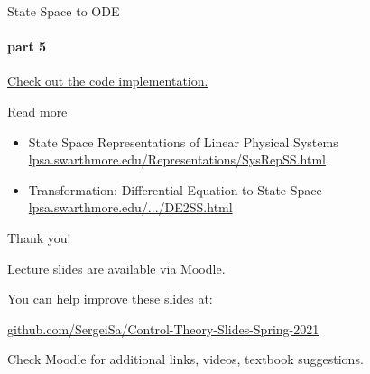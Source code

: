 \documentclass{beamer}
\begin{document}
\begin{frame}{State Space to ODE}
\framesubtitle{part 5}
\begin{flushleft}

\textcolor{blue}{\href{https://github.com/SergeiSa/Control-Theory-Slides-Spring-2022/blob/main/ColabNotebooks/StateSpace2ODE.ipynb}{Check out the code implementation.}}

\bigskip


\centerline{\textcolor{black}{}}


\end{flushleft}
\end{frame}




\begin{frame}{Read more}

\begin{itemize}
\item State Space Representations of Linear Physical Systems \href{https://lpsa.swarthmore.edu/Representations/SysRepSS.html}{lpsa.swarthmore.edu/Representations/SysRepSS.html}

\item Transformation: Differential Equation to State Space \href{https://lpsa.swarthmore.edu/Representations/SysRepTransformations/DE2SS.html}{lpsa.swarthmore.edu/.../DE2SS.html}
\end{itemize}

\end{frame}



\begin{frame}{Thank you!}
\centerline{Lecture slides are available via Moodle.}
\bigskip
\centerline{You can help improve these slides at:}
\centerline{\href{https://github.com/SergeiSa/Control-Theory-Slides-Spring-2021}{github.com/SergeiSa/Control-Theory-Slides-Spring-2021}}
\bigskip
\centerline{Check Moodle for additional links, videos, textbook suggestions.}
\end{frame}
\end{document}

